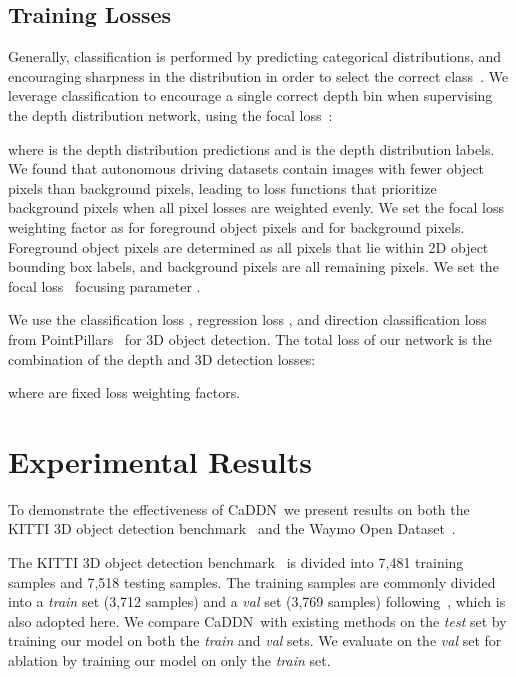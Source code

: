 \documentclass[final]{cvpr}
\newcommand{\method}{CaDDN}
\begin{document}
\subsection{Training Losses} \label{sec:TrainingLosses}
Generally, classification is performed by predicting categorical distributions, and encouraging sharpness in the distribution in order to select the correct class~\cite{Class}. We leverage classification to encourage a single correct depth bin when supervising the depth distribution network, using the focal loss~\cite{FocalLoss}:

where  is the depth distribution predictions and  is the depth distribution labels. We found that autonomous driving datasets contain images with fewer object pixels than background pixels, leading to loss functions that prioritize background pixels when all pixel losses are weighted evenly. We set the focal loss~\cite{FocalLoss} weighting factor  as   for foreground object pixels and  for background pixels. Foreground object pixels are determined as all pixels that lie within 2D object bounding box labels, and background pixels are all remaining pixels. We set the focal loss~\cite{FocalLoss} focusing parameter .

We use the classification loss , regression loss , and direction classification loss  from PointPillars~\cite{PointPillars} for 3D object detection. The total loss of our network is the combination of the depth and 3D detection losses:

\noindent
where  are fixed loss weighting factors.
\section{Experimental Results} \label{Experiments}
To demonstrate the effectiveness of \method~we present results on both the KITTI 3D object detection benchmark~\cite{Kitti} and the Waymo Open Dataset~\cite{waymo}.

The KITTI 3D object detection benchmark~\cite{Kitti} is divided into 7,481 training samples and 7,518 testing samples. The training samples are commonly divided into a \textit{train} set (3,712 samples) and a
\textit{val} set (3,769 samples) following~\cite{3DOP}, which is also adopted here. We compare \method~with existing methods on the \textit{test} set by training our model on both the \textit{train} and \textit{val} sets. We evaluate on the \textit{val} set for ablation by training our model on only the \textit{train} set.
\end{document}
